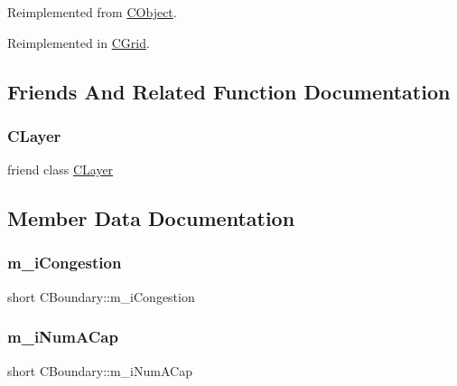Reimplemented from \mbox{\hyperlink{classCObject_a75afd905b2d14ed374c75d90f079a389}{C\+Object}}.



Reimplemented in \mbox{\hyperlink{classCGrid_a6462a8c5f7d7b6cbba02bac1d82dcbba}{C\+Grid}}.



\subsection{Friends And Related Function Documentation}
\mbox{\label{classCBoundary_a7cc4d31573956cc6792fa6757cc49219}} 
\subsubsection{\texorpdfstring{CLayer}{CLayer}}
{\footnotesize\ttfamily friend class \mbox{\hyperlink{classCLayer}{C\+Layer}}\hspace{0.3cm}{\ttfamily [friend]}}



\subsection{Member Data Documentation}
\mbox{\label{classCBoundary_aba753e35280470559958c2c2d607f6a9}} 
\subsubsection{\texorpdfstring{m\_iCongestion}{m\_iCongestion}}
{\footnotesize\ttfamily short C\+Boundary\+::m\+\_\+i\+Congestion}

\mbox{\label{classCBoundary_afded4529a5b69a422d6e15405f024987}} 
\subsubsection{\texorpdfstring{m\_iNumACap}{m\_iNumACap}}
{\footnotesize\ttfamily short C\+Boundary\+::m\+\_\+i\+Num\+A\+Cap}

\mbox{\label{classCBoundary_aab6fa7d9b76f68b8eb7c20a57469ce9e}} 
